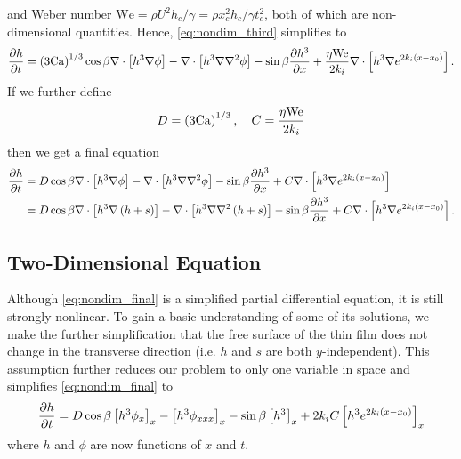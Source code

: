 and Weber number $\mathrm{We} = \rho U^2 h_c / \gamma = \rho x_c^2 h_c / \gamma t_c^2$, both of which
are non-dimensional quantities. Hence, 
\cref{eq:nondim_third} simplifies to 
\begin{align}
    \frac{\partial h}{\partial t} = \left( 3\mathrm{Ca} \right)^{1/3} \cos\beta \nabla \cdot \left[  h^3 \nabla \phi  \right] - 
    \nabla \cdot \left[ h^3 \nabla\nabla^2\phi  \right] - 
    \sin\beta \frac{\partial h^3}{\partial x} + 
    \frac{\eta \mathrm{We}}{2k_i} \nabla \cdot \left[ h^3 \nabla e^{2k_i \left( x-x_0 \right)} \right].
    \label{eq:nondim_fourth}
\end{align}  
If we further define 
\begin{equation*}
    D = \left( 3\mathrm{Ca} \right)^{1/3}, \quad C = \frac{\eta \mathrm{We}}{2k_i}
\end{equation*}
then we get a final equation 
\begin{align}
    \begin{aligned}
    \frac{\partial h}{\partial t} &= D \cos\beta \nabla \cdot \left[  h^3 \nabla \phi  \right] - 
    \nabla \cdot \left[ h^3 \nabla\nabla^2\phi  \right] - 
    \sin\beta \frac{\partial h^3}{\partial x} + 
    C \nabla \cdot \left[ h^3 \nabla e^{2k_i \left( x-x_0 \right)} \right]\\
    &= D \cos\beta \nabla \cdot \left[  h^3 \nabla \left( h+s \right)  \right] - 
    \nabla \cdot \left[ h^3 \nabla\nabla^2\left( h+s \right)  \right] - 
    \sin\beta \frac{\partial h^3}{\partial x} + 
    C \nabla \cdot \left[ h^3 \nabla e^{2k_i \left( x-x_0 \right)} \right].
    \end{aligned}
    \label{eq:nondim_final}
\end{align}  

\subsection{Two-Dimensional Equation}
Although \cref{eq:nondim_final} is a simplified partial differential equation, 
it is still strongly nonlinear. To gain a basic understanding of some of its solutions,
we make the further simplification that the free surface of the thin film does not change
in the transverse direction (i.e.\! $h$ and $s$ are both $y$-independent). This assumption
further reduces our problem to only one variable in space and simplifies \cref{eq:nondim_final} to 
\begin{align}
    \frac{\partial h}{\partial t} = D\cos\beta \left[ h^3 \phi_x \right]_x - \left[ h^3 \phi_{xxx} \right]_{x} - \sin\beta \left[ h^3 \right]_{x} + 2k_iC \left[ h^3 e^{2k_i \left( x-x_0 \right)} \right]_x
    \label{eq:two_dim_final}
\end{align}
where $h$ and $\phi$ are now functions of $x$ and $t$.    